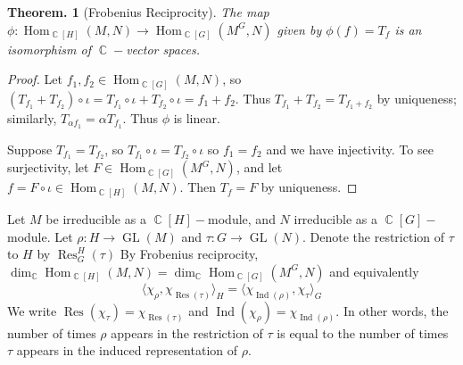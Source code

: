 \documentclass[11pt, a4paper]{memoir}
\DeclareMathOperator{\C}{{\mathbb{C}}}
\theoremstyle{change}
\newtheorem{theorem}{Theorem.}[section]
\theoremstyle{plain}
\theoremstyle{nonumberplain}
\newtheorem{proof}{Proof}
\DeclareMathOperator{\GL}{GL}
\DeclareMathOperator{\Hom}{Hom}
\DeclareMathOperator{\Res}{Res}
\DeclareMathOperator{\Ind}{Ind}
\numberwithin{equation}{section}
\begin{document}
\begin{theorem}[Frobenius Reciprocity]
    The map $\phi:\Hom_{\C[H]}(M,N)\to\Hom_{\C[G]}(M^G,N)$ given by $\phi(f)=T_f$ is an isomorphism of $\C-$vector spaces.
\end{theorem}
\begin{proof}
    Let $f_1,f_2\in\Hom_{\C[G]}(M,N)$, so $(T_{f_1}+T_{f_2})\circ\iota=T_{f_1}\circ\iota+T_{f_2}\circ\iota=f_1+f_2$.
    Thus $T_{f_1}+T_{f_2}=T_{f_1+f_2}$ by uniqueness; similarly, $T_{\alpha f_1}=\alpha T_{f_1}$.
    Thus $\phi$ is linear.

    Suppose $T_{f_1}=T_{f_2}$, so $T_{f_1}\circ\iota=T_{f_2}\circ\iota$ so $f_1=f_2$ and we have injectivity.
    To see surjectivity, let $F\in\Hom_{\C[G]}(M^G,N)$, and let $f=F\circ\iota\in\Hom_{\C[H]}(M,N)$.
    Then $T_f=F$ by uniqueness.
\end{proof}
Let $M$ be irreducible as a $\C[H]-$module, and $N$ irreducible as a $\C[G]-$module.
Let $\rho:H\to\GL(M)$ and $\tau:G\to\GL(N)$.
Denote the restriction of $\tau$ to $H$ by $\Res_G^H(\tau)$
By Frobenius reciprocity, $\dim_{\C}\Hom_{\C[H]}(M,N)=\dim_{\C}\Hom_{\C[G]}(M^G,N)$ and equivalently
\begin{equation*}
    \langle \chi_\rho,\chi_{\Res(\tau)}\rangle_H = \langle \chi_{\Ind(\rho)},\chi_\tau\rangle_G
\end{equation*}
We write $\Res(\chi_\tau)=\chi_{\Res(\tau)}$ and $\Ind(\chi_\rho)=\chi_{\Ind(\rho)}$.
In other words, the number of times $\rho$ appears in the restriction of $\tau$ is equal to the number of times $\tau$ appears in the induced representation of $\rho$.
\end{document}
